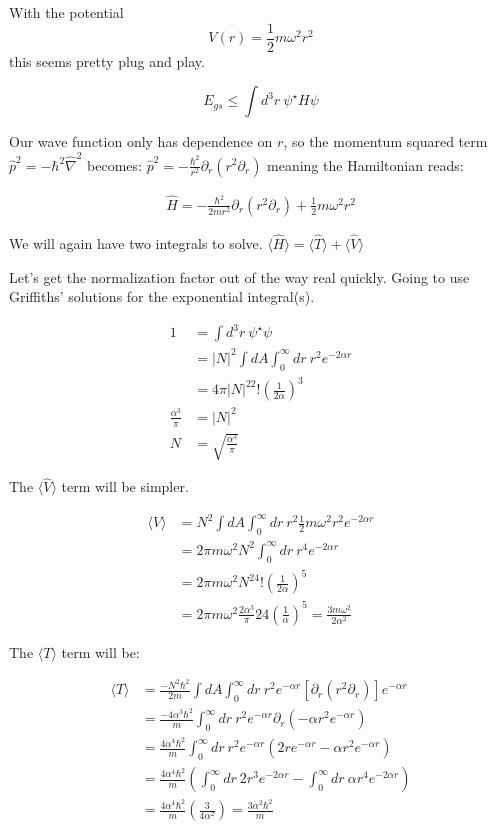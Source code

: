 \documentclass{article}
\newcommand{\p}[1]{\left(#1\right)}
\newcommand{\braket}[1]{\langle#1\rangle}
\begin{document}
With the potential $$V(r)=\frac{1}{2}m\omega^2r^2$$ this seems pretty plug and play.

$$E_{gs}\leq\int{d^3r}\:\psi^\star{H}\psi$$

Our wave function only has dependence on $r$, so the momentum squared term $\hat{p}^2=-\hbar^2\hat\nabla^2$ becomes: $\hat{p}^2=-\frac{\hbar^2}{r^2}\partial_r\p{r^2\partial_r}$ meaning the Hamiltonian reads:

\begin{align*}
    \hat{H}=-\frac{\hbar^2}{2mr^2}\partial_r\p{r^2\partial_r}+\frac{1}{2}m\omega^2r^2
\end{align*}

We will again have two integrals to solve. $\braket{\hat{H}}=\braket{\hat{T}}+\braket{\hat{V}}$

Let's get the normalization factor out of the way real quickly. Going to use Griffiths' solutions for the exponential integral(s).

\begin{align*}
    1&=\int{d^3r}\:\psi^\star\psi\\[1em]
    &=|N|^2\int{dA}\int_{0}^{\infty}dr\:r^2e^{-2\alpha{r}}\\[1em]
    &=4\pi|N|^22!\p{\frac{1}{2\alpha}}^{3}\\[1em]
    \frac{\alpha^3}{\pi}&=|N|^2\\[1em]
    N&=\sqrt{\frac{\alpha^3}{\pi}}
\end{align*}

The $\braket{\hat{V}}$ term will be simpler.

\begin{align*}
    \braket{{V}}&=N^2\int{dA}\int_{0}^{\infty}dr\:r^2\frac{1}{2}m\omega^2r^2e^{-2\alpha{r}}\\[1em]
    &=2\pi{m}\omega^2{N^2}\int_{0}^{\infty}dr\:r^4e^{-2\alpha{r}}\\[1em]
    &=2\pi{m}\omega^2N^24!\p{\frac{1}{2\alpha}}^{5}\\[1em]
    &=2\pi{m}\omega^2\frac{2\alpha^3}{\pi}24\p{\frac{1}{\alpha}}^5=\frac{3m\omega^2}{2\alpha^2}
\end{align*}

The $\braket{T}$ term will be:

\begin{align*}
    \braket{T}&=\frac{-N^2\hbar^2}{2m}\int{dA}\int_{0}^{\infty}dr\:r^2e^{-\alpha{r}}[\partial_r\p{r^2\partial_r}]e^{-\alpha{r}}\\[1em]
    &=\frac{-4\alpha^3\hbar^2}{m}\int_{0}^{\infty}dr\:r^2e^{-\alpha{r}}\partial_r\p{-\alpha{r^2}e^{-\alpha{r}}}\\[1em]
    &=\frac{4\alpha^4\hbar^2}{m}\int_{0}^{\infty}dr\:r^2e^{-\alpha{r}}\p{2re^{-\alpha{r}}-\alpha{r^2}e^{-\alpha{r}}}\\[1em]
    &=\frac{4\alpha^4\hbar^2}{m}\p{\int_{0}^{\infty}dr\:2r^3e^{-2\alpha{r}}-\int_{0}^{\infty}dr\:\alpha{r^4}e^{-2\alpha{r}}}\\[1em]
    &=\frac{4\alpha^4\hbar^2}{m}\p{\frac{3}{4\alpha^2}}=\frac{3\alpha^2\hbar^2}{m}
\end{align*}
\end{document}
